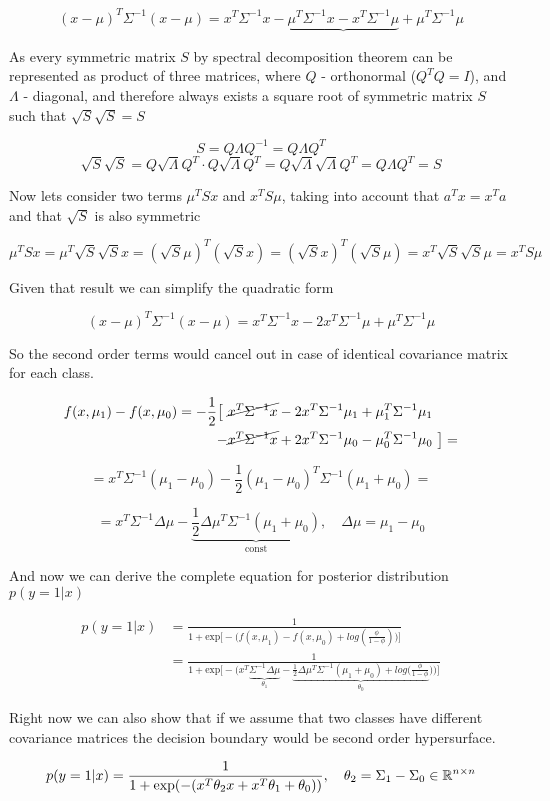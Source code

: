 \documentclass{article}
\begin{document}
\[
(x - \mu)^T \Sigma^{-1} (x - \mu) = x^T \Sigma^{-1} x 
- \underbrace{\mu^T \Sigma^{-1} x - x^T \Sigma^{-1} \mu }
+ \mu^T \Sigma^{-1} \mu
\]

As every symmetric matrix $S$ by spectral decomposition theorem can be represented as product of three matrices, where $Q$ - orthonormal ($Q^T Q = I$), and $\Lambda$ - diagonal, and therefore always exists a square root of symmetric matrix $S$ such that $\sqrt S \sqrt S = S$

$$ S = Q \Lambda Q^{-1} = Q \Lambda Q^T $$
$$ \sqrt S \sqrt S = Q \sqrt\Lambda Q^T \cdot Q \sqrt\Lambda Q^T  = Q \sqrt\Lambda  \sqrt\Lambda Q^T = Q \Lambda Q^T = S$$

Now lets consider two terms $\mu^T S x$ and $x^T S \mu$, taking into account that $a^T x = x^T a$ and that $\sqrt S$ is also symmetric

$$\mu^T S x = \mu^T \sqrt S \sqrt S x = (\sqrt S \mu)^T (\sqrt S x) =  (\sqrt S x)^T (\sqrt S \mu) = x^T \sqrt S \sqrt S \mu =  x^T S \mu$$

Given that result we can simplify the quadratic form 

$$(x - \mu)^T \Sigma^{-1} (x - \mu) 
= x^T \Sigma^{-1} x 
- 2 x^T \Sigma^{-1} \mu 
+ \mu^T \Sigma^{-1} \mu$$

\bigbreak

So the second order terms would cancel out in case of identical covariance matrix for each class. 

\begin{align}
f(x, \mu_1) - f(x, \mu_0) 
= -\frac12 \big [ \ & \cancel{x^T \Sigma^{-1} x} - 2 x^T\Sigma^{-1} \mu_1 + \mu_1^T \Sigma^{-1} \mu_1 \\ 
	- & \cancel{x^T \Sigma^{-1} x} + 2 x^T\Sigma^{-1} \mu_0 - \mu_0^T \Sigma^{-1} \mu_0
\ \big]=
\end{align}

$$
= x^T \Sigma^{-1} (\mu_1 - \mu_0) -
	 \frac 12 (\mu_1-\mu_0)^T \Sigma^{-1} (\mu_1 + \mu_0) =
$$

$$
= x^T \Sigma^{-1} \Delta\mu -
	\underbrace{\frac 12 \Delta\mu^T \Sigma^{-1} (\mu_1 + \mu_0)}_\text{const}
, \quad \Delta\mu = \mu_1 - \mu_0
$$

And now we can derive the complete equation for posterior distribution $p(y=1|x)$

\begin{align}
p(y = 1| x) 
&=\frac1 {1 + \text{exp} \Big [-\Big (f(x, \mu_1) - f(x, \mu_0) + log(\frac{\phi}{1-\phi}) \Big) \Big ]} \\
&=\frac1 {1 + \text{exp} \Big[ -\Big(
	x^T \underbrace{
		\Sigma^{-1} \Delta\mu
	}_{\theta_1} - 
	\underbrace{
		\frac 12 \Delta\mu^T \Sigma^{-1} (\mu_1 + \mu_0)
		+ log(\frac{\phi}{1 - \phi}
	}_{\theta_0}
	) \Big) \Big]}
\end{align}

Right now we can also show that if we assume that two classes have different covariance matrices the decision boundary would be second order hypersurface.

\[
p(y = 1| x) 
=\frac1 {1 + \text{exp}(-(
		x^T \theta_2  x +
		x^T \theta_1 + 
		\theta_0
	))}, \quad \theta_2  = \Sigma_1 - \Sigma_0 \in{\Bbb R}^{n \times n}
\]
\end{document}
